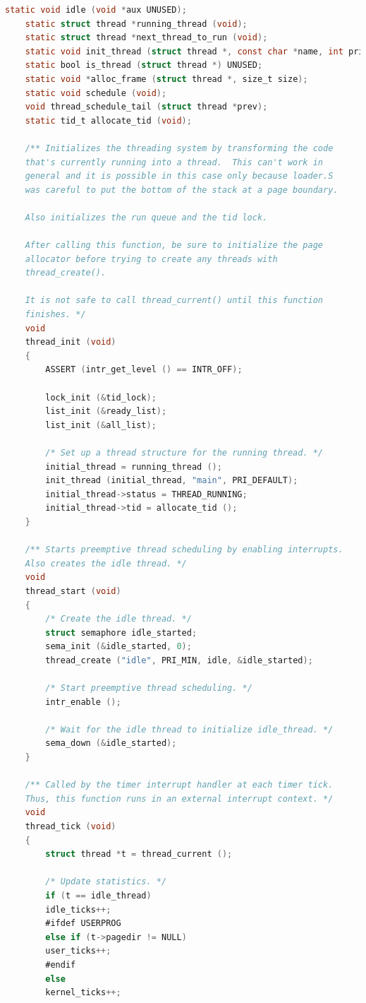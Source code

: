 \documentclass{article}
\begin{document}
\begin{lstlisting}[language=C, title=\texttt{thread.c}]
	static void idle (void *aux UNUSED);
	static struct thread *running_thread (void);
	static struct thread *next_thread_to_run (void);
	static void init_thread (struct thread *, const char *name, int priority);
	static bool is_thread (struct thread *) UNUSED;
	static void *alloc_frame (struct thread *, size_t size);
	static void schedule (void);
	void thread_schedule_tail (struct thread *prev);
	static tid_t allocate_tid (void);
	
	/** Initializes the threading system by transforming the code
	that's currently running into a thread.  This can't work in
	general and it is possible in this case only because loader.S
	was careful to put the bottom of the stack at a page boundary.
	
	Also initializes the run queue and the tid lock.
	
	After calling this function, be sure to initialize the page
	allocator before trying to create any threads with
	thread_create().
	
	It is not safe to call thread_current() until this function
	finishes. */
	void
	thread_init (void) 
	{
		ASSERT (intr_get_level () == INTR_OFF);
		
		lock_init (&tid_lock);
		list_init (&ready_list);
		list_init (&all_list);
		
		/* Set up a thread structure for the running thread. */
		initial_thread = running_thread ();
		init_thread (initial_thread, "main", PRI_DEFAULT);
		initial_thread->status = THREAD_RUNNING;
		initial_thread->tid = allocate_tid ();
	}
	
	/** Starts preemptive thread scheduling by enabling interrupts.
	Also creates the idle thread. */
	void
	thread_start (void) 
	{
		/* Create the idle thread. */
		struct semaphore idle_started;
		sema_init (&idle_started, 0);
		thread_create ("idle", PRI_MIN, idle, &idle_started);
		
		/* Start preemptive thread scheduling. */
		intr_enable ();
		
		/* Wait for the idle thread to initialize idle_thread. */
		sema_down (&idle_started);
	}
	
	/** Called by the timer interrupt handler at each timer tick.
	Thus, this function runs in an external interrupt context. */
	void
	thread_tick (void) 
	{
		struct thread *t = thread_current ();
		
		/* Update statistics. */
		if (t == idle_thread)
		idle_ticks++;
		#ifdef USERPROG
		else if (t->pagedir != NULL)
		user_ticks++;
		#endif
		else
		kernel_ticks++;
		

\end{lstlisting}
\end{document}
